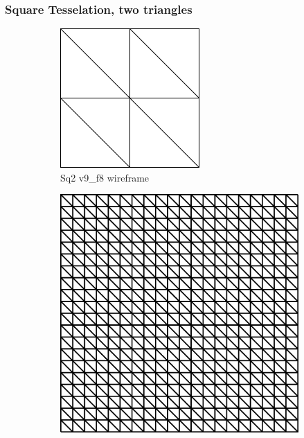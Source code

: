\subsubsection{Square Tesselation, two triangles}
\begin{figure}[ht]
\ffigbox
	{\begin{subfigure}[b]{0.48\linewidth}
		\includegraphics[width=1.0\linewidth,height=0.32\textheight,keepaspectratio]{data/synthetic_meshes/square_tesselation_2tri_Dirac_delta_1_v9_f8_wireframe.png}
		\caption{Sq2 v9\_f8 wireframe}\label{fig:sq2.a}
	\end{subfigure}
	\begin{subfigure}[b]{0.48\linewidth}
		\includegraphics[width=1.0\linewidth,height=0.32\textheight,keepaspectratio]{data/synthetic_meshes/square_tesselation_2tri_Dirac_delta_10_v441_f800_wireframe.png}

\end{subfigure}}
\end{figure}
